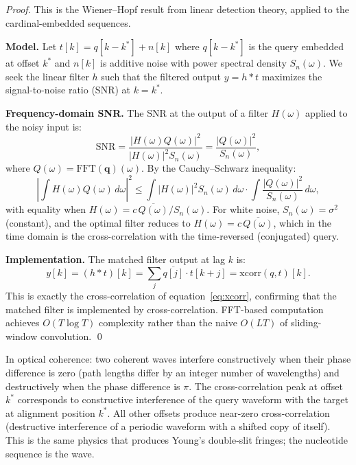 \begin{proof}
This is the Wiener--Hopf result from linear detection theory, applied to the
cardinal-embedded sequences.

\medskip
\noindent\textbf{Model.} Let $t[k] = q[k - k^*] + n[k]$ where $q[k-k^*]$ is
the query embedded at offset $k^*$ and $n[k]$ is additive noise with power
spectral density $S_n(\omega)$. We seek the linear filter $h$ such that the
filtered output $y = h * t$ maximizes the signal-to-noise ratio (SNR) at $k=k^*$.

\medskip
\noindent\textbf{Frequency-domain SNR.} The SNR at the output of a filter $H(\omega)$
applied to the noisy input is:
\begin{equation}
  \mathrm{SNR} = \frac{|H(\omega) Q(\omega)|^2}{|H(\omega)|^2 S_n(\omega)}
  = \frac{|Q(\omega)|^2}{S_n(\omega)},
\end{equation}
where $Q(\omega) = \mathrm{FFT}(\mathbf{q})(\omega)$.
By the Cauchy--Schwarz inequality:
\begin{equation}
  \left|\int H(\omega) Q(\omega)\,d\omega\right|^2
  \leq \int |H(\omega)|^2 S_n(\omega)\,d\omega \cdot \int \frac{|Q(\omega)|^2}{S_n(\omega)}\,d\omega,
\end{equation}
with equality when $H(\omega) = c \, \overline{Q(\omega)} / S_n(\omega)$.
For white noise, $S_n(\omega) = \sigma^2$ (constant), and the optimal filter
reduces to $H(\omega) = c \, \overline{Q(\omega)}$, which in the time domain
is the cross-correlation with the time-reversed (conjugated) query.

\medskip
\noindent\textbf{Implementation.} The matched filter output at lag $k$ is:
\begin{equation}
  y[k] = (h * t)[k] = \sum_j \overline{q[j]} \cdot t[k+j]
  = \mathrm{xcorr}(q,t)[k].
\end{equation}
This is exactly the cross-correlation of equation~\eqref{eq:xcorr},
confirming that the matched filter is implemented by cross-correlation.
FFT-based computation achieves $O(T \log T)$ complexity rather than the
naive $O(LT)$ of sliding-window convolution. \qed
\end{proof}

\begin{remark}
In optical coherence: two coherent waves interfere constructively when their
phase difference is zero (path lengths differ by an integer number of wavelengths)
and destructively when the phase difference is $\pi$. The cross-correlation
peak at offset $k^*$ corresponds to constructive interference of the query
waveform with the target at alignment position $k^*$. All other offsets
produce near-zero cross-correlation (destructive interference of a periodic
waveform with a shifted copy of itself). This is the same physics that produces
Young's double-slit fringes; the nucleotide sequence is the wave.
\end{remark}

